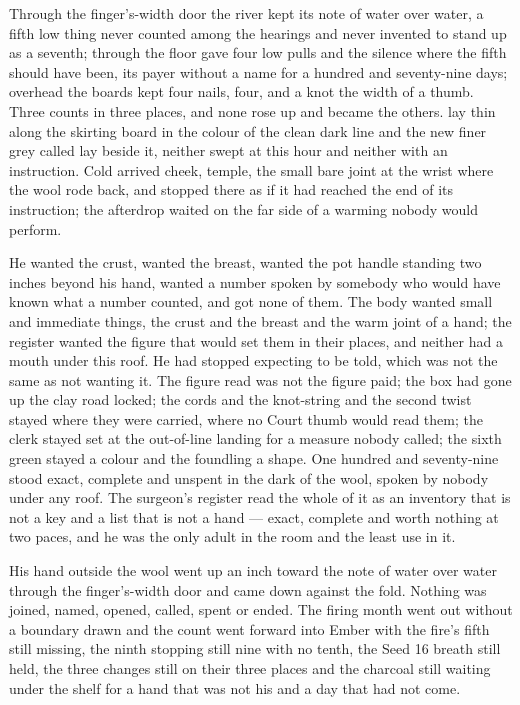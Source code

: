Through the finger's-width door the river kept its note of water over water, a fifth low thing never counted among the hearings and never invented to stand up as a seventh; through the floor  gave four low pulls and the silence where the fifth should have been, its payer without a name for a hundred and seventy-nine days; overhead the boards kept four nails, four, and a knot the width of a thumb. Three counts in three places, and none rose up and became the others.  lay thin along the skirting board in the colour of the clean dark line and the new finer grey called  lay beside it, neither swept at this hour and neither with an instruction. Cold arrived cheek, temple, the small bare joint at the wrist where the wool rode back, and stopped there as if it had reached the end of its instruction; the afterdrop waited on the far side of a warming nobody would perform.

He wanted the crust, wanted the breast, wanted the pot handle standing two inches beyond his hand, wanted a number spoken by somebody who would have known what a number counted, and got none of them. The body wanted small and immediate things, the crust and the breast and the warm joint of a hand; the register wanted the figure that would set them in their places, and neither had a mouth under this roof. He had stopped expecting to be told, which was not the same as not wanting it. The figure read was not the figure paid; the box had gone up the clay road locked; the cords and the knot-string and the second twist stayed where they were carried, where no Court thumb would read them; the clerk stayed set at the out-of-line landing for a measure nobody called; the sixth green stayed a colour and the foundling a shape. One hundred and seventy-nine stood exact, complete and unspent in the dark of the wool, spoken by nobody under any roof. The surgeon's register read the whole of it as an inventory that is not a key and a list that is not a hand --- exact, complete and worth nothing at two paces, and he was the only adult in the room and the least use in it.

His hand outside the wool went up an inch toward the note of water over water through the finger's-width door and came down against the fold. Nothing was joined, named, opened, called, spent or ended. The firing month went out without a boundary drawn and the count went forward into Ember with the fire's fifth still missing, the ninth stopping still nine with no tenth, the Seed 16 breath still held, the three changes still on their three places and the charcoal still waiting under the shelf for a hand that was not his and a day that had not come.
